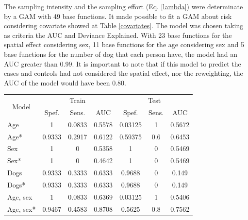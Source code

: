 \documentclass[10pt,letterpaper]{article}
\begin{document}
The sampling intensity and the sampling effort (Eq. \ref{lambda}) were determinate by a GAM with 49 base functions. It made possible to fit a GAM about risk  considering covariate showed at Table \ref{covariates}. The model was chosen taking as criteria the AUC and Deviance Explained. With 23 base functions for the spatial effect considering sex, 11 base functions for the age considering sex and 5 base functions for the number of dog that each person have, the model had an AUC greater than 0.99. It is important to note that if this model to predict the cases and controls had not considered the spatial effect, nor the reweighting, the AUC of the model would have been 0.80. 
\begin{table}[]
	\centering
	\label{model_metricas}
	\begin{tabular}{@{}lcccccc@{}}
		\toprule
		\multicolumn{1}{c}{\multirow{2}{*}{Model}} & \multicolumn{3}{c}{Train}                          & \multicolumn{3}{c}{Test}            \\ \cmidrule(l){2-7} 
		\multicolumn{1}{c}{}                        & Spef. & Sens. & \multicolumn{1}{c|}{AUC}    & Spef. & Sens. & AUC    \\ \midrule
		\multicolumn{1}{l|}{Age}            & 1             & 0.0833       & \multicolumn{1}{c|}{0.5578} & 0.03125       & 1            & 0.5672 \\
		\multicolumn{1}{l|}{Age*}        & 0.9333        & 0.2917       & \multicolumn{1}{c|}{0.6122} & 0.59375       & 0.6          & 0.6453 \\
		\multicolumn{1}{l|}{Sex}            & 1             & 0            & \multicolumn{1}{c|}{0.5358} & 1             & 0            & 0.5469 \\
		\multicolumn{1}{l|}{Sex*}        & 1             & 0            & \multicolumn{1}{c|}{0.4642} & 1             & 0            & 0.5469 \\
		\multicolumn{1}{l|}{Dogs}          & 0.9333        & 0.3333       & \multicolumn{1}{c|}{0.6333} & 0.9688        & 0            & 0.149  \\
		\multicolumn{1}{l|}{Dogs*}      & 0.9333        & 0.3333       & \multicolumn{1}{c|}{0.6333} & 0.9688        & 0            & 0.149  \\
		\multicolumn{1}{l|}{Age, sex}       & 1             & 0.0833       & \multicolumn{1}{c|}{0.6369} & 0.03125       & 1            & 0.5406 \\
		\multicolumn{1}{l|}{Age, sex*}   & 0.9467        & 0.4583       & \multicolumn{1}{c|}{0.8708} & 0.5625        & 0.8          & 0.7562 \\

\end{tabular}
\end{table}
\end{document}
